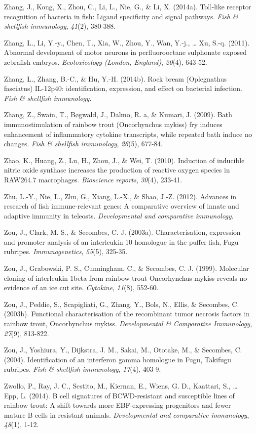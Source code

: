 \documentclass[12pt,letterpaper,oneside]{scrbook}
\begin{document}
Zhang, J., Kong, X., Zhou, C., Li, L., Nie, G., \& Li, X. (2014a).
Toll-like receptor recognition of bacteria in fish: Ligand specificity
and signal pathways. \emph{Fish \& shellfish immunology}, \emph{41}(2),
380-388.

Zhang, L., Li, Y.-y., Chen, T., Xia, W., Zhou, Y., Wan, Y.-j., \ldots{}
Xu, S.-q. (2011). Abnormal development of motor neurons in
perfluorooctane sulphonate exposed zebrafish embryos.
\emph{Ecotoxicology (London, England)}, \emph{20}(4), 643-52.

Zhang, L., Zhang, B.-C., \& Hu, Y.-H. (2014b). Rock bream (Oplegnathus
fasciatus) IL-12p40: identification, expression, and effect on bacterial
infection. \emph{Fish \& shellfish immunology}.

Zhang, Z., Swain, T., Bøgwald, J., Dalmo, R. a, \& Kumari, J. (2009).
Bath immunostimulation of rainbow trout (Oncorhynchus mykiss) fry
induces enhancement of inflammatory cytokine transcripts, while repeated
bath induce no changes. \emph{Fish \& shellfish immunology},
\emph{26}(5), 677-84.

Zhao, K., Huang, Z., Lu, H., Zhou, J., \& Wei, T. (2010). Induction of
inducible nitric oxide synthase increases the production of reactive
oxygen species in RAW264.7 macrophages. \emph{Bioscience reports},
\emph{30}(4), 233-41.

Zhu, L.-Y., Nie, L., Zhu, G., Xiang, L.-X., \& Shao, J.-Z. (2012).
Advances in research of fish immune-relevant genes: A comparative
overview of innate and adaptive immunity in teleosts.
\emph{Developmental and comparative immunology}.

Zou, J., Clark, M. S., \& Secombes, C. J. (2003a). Characterisation,
expression and promoter analysis of an interleukin 10 homologue in the
puffer fish, Fugu rubripes. \emph{Immunogenetics}, \emph{55}(5), 325-35.

Zou, J., Grabowski, P. S., Cunningham, C., \& Secombes, C. J. (1999).
Molecular cloning of interleukin 1beta from rainbow trout Oncorhynchus
mykiss reveals no evidence of an ice cut site. \emph{Cytokine},
\emph{11}(8), 552-60.

Zou, J., Peddie, S., Scapigliati, G., Zhang, Y., Bols, N., Ellis, \&
Secombes, C. (2003b). Functional characterisation of the recombinant
tumor necrosis factors in rainbow trout, Oncorhynchus mykiss.
\emph{Developmental \& Comparative Immunology}, \emph{27}(9), 813-822.

Zou, J., Yoshiura, Y., Dijkstra, J. M., Sakai, M., Ototake, M., \&
Secombes, C. (2004). Identification of an interferon gamma homologue in
Fugu, Takifugu rubripes. \emph{Fish \& shellfish immunology},
\emph{17}(4), 403-9.

Zwollo, P., Ray, J. C., Sestito, M., Kiernan, E., Wiens, G. D.,
Kaattari, S., \ldots{} Epp, L. (2014). B cell signatures of
BCWD-resistant and susceptible lines of rainbow trout: A shift towards
more EBF-expressing progenitors and fewer mature B cells in resistant
animals. \emph{Developmental and comparative immunology}, \emph{48}(1),
1-12.
\end{document}
